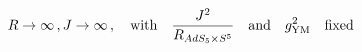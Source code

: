 \begin{equation}
\label{limitbmn} R\rightarrow \infty\,,J\rightarrow \infty\,,\quad
{\rm with}\quad \frac{J^2}{R_{AdS_5\times S^5}} \quad {\rm and}
\quad g^2_{\rm YM} \quad {\rm fixed}
\end{equation}

